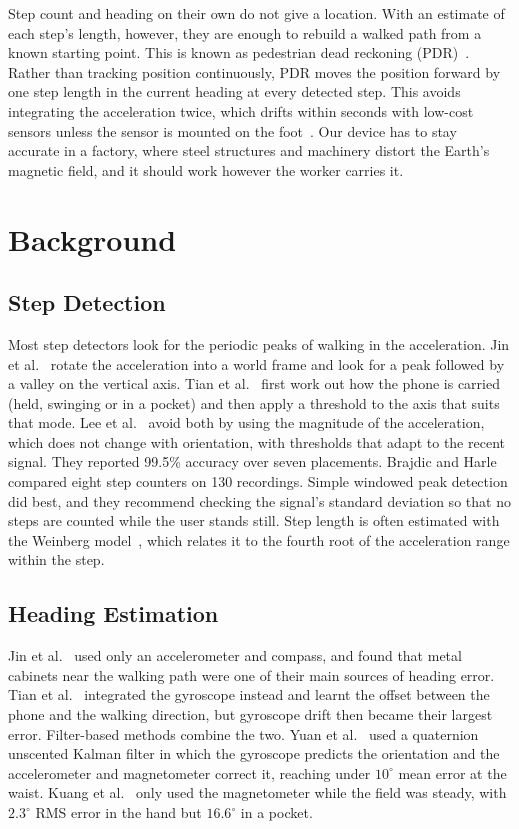 \documentclass[conference,a4paper]{IEEEtran}
\begin{document}
Step count and heading on their own do not give a location. With an estimate of each step's
length, however, they are enough to rebuild a walked path from a known starting point. This is known as pedestrian dead reckoning (PDR)~\cite{jin2011,tian2016}.
Rather than tracking position continuously, PDR moves the position forward by one step length
in the current heading at every detected step. This avoids integrating the acceleration twice,
which drifts within seconds with low-cost sensors unless the sensor is mounted on the
foot~\cite{jin2011}. Our device has to stay accurate in a factory, where steel structures and machinery distort the
Earth's magnetic field, and it should work however the worker carries it.

\section{Background}
\subsection{Step Detection}
Most step detectors look for the periodic peaks of walking in the acceleration. Jin et al.~\cite{jin2011} rotate the acceleration into a world frame and look for a peak
followed by a valley on the vertical axis. Tian et al.~\cite{tian2016} first work out how the
phone is carried (held, swinging or in a pocket) and then apply a threshold to the axis that
suits that mode. Lee et al.~\cite{lee2015} avoid both by using the magnitude of the
acceleration, which does not change with orientation, with thresholds that adapt to the recent
signal. They reported 99.5\% accuracy over seven placements. Brajdic and Harle~\cite{brajdic2013}
compared eight step counters on 130 recordings. Simple windowed peak detection did best, and
they recommend checking the signal's standard deviation so that no steps are counted while the
user stands still. Step length is often estimated with the Weinberg model~\cite{weinberg2002},
which relates it to the fourth root of the acceleration range within the step.

\subsection{Heading Estimation}
Jin et al.~\cite{jin2011} used only an accelerometer and compass, and found that metal cabinets
near the walking path were one of their main sources of heading error. Tian et
al.~\cite{tian2016} integrated the gyroscope instead and learnt the offset between the phone
and the walking direction, but gyroscope drift then became their largest error. Filter-based
methods combine the two. Yuan et al.~\cite{yuan2015} used a quaternion unscented Kalman filter
in which the gyroscope predicts the orientation and the accelerometer and magnetometer correct
it, reaching under $10^\circ$ mean error at the waist. Kuang et al.~\cite{kuang2018} only used
the magnetometer while the field was steady, with $2.3^\circ$ RMS error in the hand but
$16.6^\circ$ in a pocket.
\end{document}
